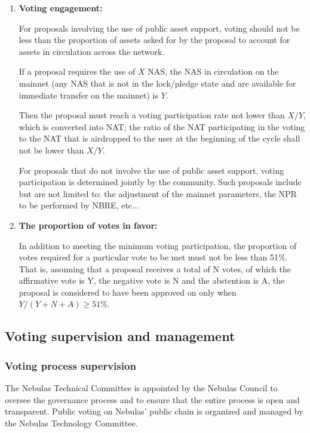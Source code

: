 \begin{enumerate}
	\item

	\textbf{Voting engagement:}

	For proposals involving the use of public asset support, voting should not be less than the proportion of assets asked for by the proposal to account for assets in circulation across the network.

	If a proposal requires the use of $X$ NAS, the NAS in circulation on the
	  mainnet (any NAS that is not in the lock/pledge state and are available for
	  immediate transfer on the mainnet) is $Y$.

	Then the proposal must reach a voting participation rate not lower than
	  $X/Y$, which is converted into NAT; the ratio of the NAT participating in
	  the voting to the NAT that is airdropped to the user at the beginning of
	  the cycle shall not be lower than $X/Y$.

	For proposals that do not involve the use of public asset support, voting participation is determined jointly by the community. Such proposals include but are not limited to: the adjustment of the mainnet parameters, the NPR to be performed by NBRE, etc...

	\item

	\textbf{The proportion of votes in favor:}

	In addition to meeting the minimum voting participation, the proportion of
	  votes required for a particular vote to be met must not be less than 51\%.
	  That is, assuming that a proposal receives a total of N votes, of which the
	  affirmative vote is Y, the negative vote is N and the abstention is A, the
	  proposal is considered to have been approved on only when $Y/(Y+N+A) \ge
	  51\%$.

\end{enumerate}

\subsection{Voting supervision and management}

\subsubsection{Voting process supervision}
\label{second-vote}

The Nebulas Technical Committee is appointed by the Nebulas Council to oversee the governance process and to ensure that the entire process is open and transparent. Public voting on Nebulas' public chain is organized and managed by the Nebulas Technology Committee.


